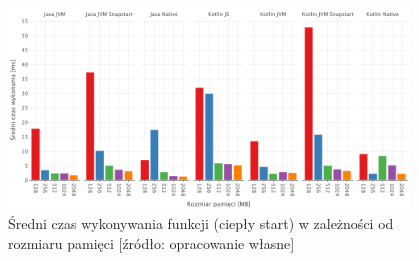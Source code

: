 \begin{figure}[h]
    \centering
    \includegraphics[width=0.95\textwidth]{charts/results/avg-warm-start.png}
    \caption{Średni czas wykonywania funkcji (ciepły start) w zależności od rozmiaru pamięci [źródło: opracowanie własne]}
    \label{fig:avg_warm_start}
\end{figure}

